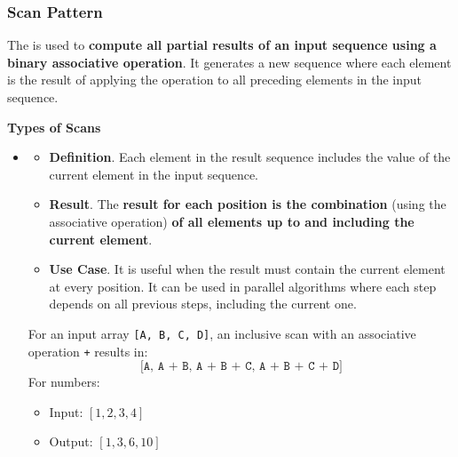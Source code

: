 \subsubsection{Scan Pattern}

The  is used to \textbf{compute all partial results of an input sequence using a binary associative operation}. It generates a new sequence where each element is the result of applying the operation to all preceding elements in the input sequence.

\highspace
\begin{flushleft}
    \textcolor{Green3}{ \textbf{Types of Scans}}
\end{flushleft}
\begin{itemize}
    \item {}
    \begin{itemize}
        \item[\textcolor{Red2}{\faIcon{book}}] \textcolor{Red2}{\textbf{Definition}}. Each element in the result sequence includes the value of the current element in the input sequence.
    
        \item[\textcolor{Green3}{\faIcon{poll}}] \textcolor{Green3}{\textbf{Result}}. The \textbf{result for each position is the combination} (using the associative operation) \textbf{of all elements up to and including the current element}.

        \item[\textcolor{Green3}{\faIcon{check-circle}}] \textcolor{Green3}{\textbf{Use Case}}. It is useful when the result must contain the current element at every position. It can be used in parallel algorithms where each step depends on all previous steps, including the current one.
    \end{itemize}
    \begin{examplebox}
        For an input array \texttt{[A, B, C, D]}, an inclusive scan with an associative operation \texttt{+} results in:
        \begin{equation*}
            \texttt{[A, A + B, A + B + C, A + B + C + D]}
        \end{equation*}
        For numbers:
        \begin{itemize}
            \item Input: $\left[1, 2, 3, 4\right]$
            \item Output: $\left[1, 3, 6, 10\right]$
        \end{itemize}
    \end{examplebox}



\end{itemize}
